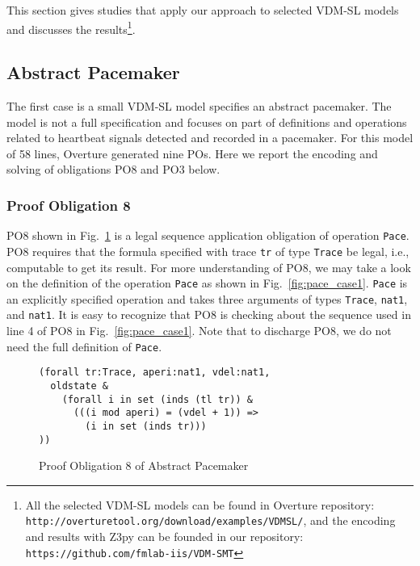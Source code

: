 This section gives studies that apply our approach to selected VDM-SL models and discusses the results\footnote{All the selected VDM-SL models can be found in Overture repository: {\tt http://overturetool.org/download/examples/VDMSL/}, and the encoding and results with Z3py can be founded in our repository: {\tt https://github.com/fmlab-iis/VDM-SMT}}.

\subsection{Abstract Pacemaker}
\label{section:case1}

The first case is a small VDM-SL model specifies an abstract pacemaker. The model is not a full specification and focuses on part of definitions and operations related to heartbeat signals detected and recorded in a pacemaker. For this model of 58 lines, Overture generated nine POs. Here we report the encoding and solving of obligations PO8 and PO3 below.

\subsubsection{Proof Obligation 8}

PO8 shown in Fig.~\ref{fig:po8_case1} is a legal sequence application obligation of operation {\tt Pace}.  PO8 requires that the formula specified with trace {\tt tr} of type {\tt Trace} be legal, i.e., computable to get its result. For more understanding of PO8, we may take a look on the definition of the operation {\tt Pace} as shown in Fig.~\ref{fig:pace_case1}. {\tt Pace} is an explicitly specified operation and takes three arguments of types {\tt Trace}, {\tt nat1}, and {\tt nat1}. It is easy to recognize that PO8 is checking about the sequence used in line 4 of PO8 in Fig.~\ref{fig:pace_case1}. Note that to discharge PO8, we do not need the full definition of {\tt Pace}.

\begin{figure}[t]
\begin{center}
\begin{mdframed}[roundcorner=5pt]
\begin{Verbatim}[fontsize=\small]
(forall tr:Trace, aperi:nat1, vdel:nat1,
  oldstate & 
    (forall i in set (inds (tl tr)) &
      (((i mod aperi) = (vdel + 1)) =>
        (i in set (inds tr)))
))
\end{Verbatim}
\end{mdframed}
\vspace{-10pt}
\caption{Proof Obligation 8 of Abstract Pacemaker}
\label{fig:po8_case1}
\end{center}
\end{figure}


